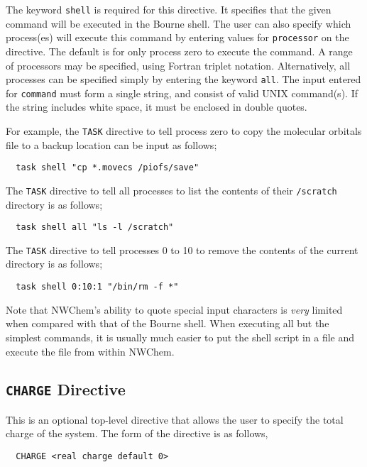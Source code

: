The keyword \verb+shell+ is required for this directive.  It specifies
that the given command will be executed in the Bourne shell.  The user
can also specify which process(es) will execute this command by
entering values for \verb+processor+ on the directive.  The default is
for only process zero to execute the command.  A range of processors
may be specified, using Fortran triplet notation.  Alternatively, all
processes can be specified simply by entering the keyword \verb+all+.
The input entered for \verb+command+ must form a single string, and
consist of valid UNIX command(s).  If the string includes white space,
it must be enclosed in double quotes.

For example, the \verb+TASK+ directive to tell process zero to copy the 
molecular orbitals file to a backup location can be input as follows;

\begin{verbatim}
  task shell "cp *.movecs /piofs/save"
\end{verbatim}

The \verb+TASK+ directive to tell all processes to list the contents of 
their \verb+/scratch+ directory is as follows;

\begin{verbatim}
  task shell all "ls -l /scratch"
\end{verbatim}

The \verb+TASK+ directive to tell processes 0 to 10 to remove the 
contents of the current directory is as follows;

\begin{verbatim}
  task shell 0:10:1 "/bin/rm -f *"
\end{verbatim}

Note that NWChem's ability to quote special input characters is {\em
  very} limited when compared with that of the Bourne shell.  When
executing all but the simplest commands, it is usually much easier to
put the shell script in a file and execute the file from within
NWChem.

\subsection{{\tt CHARGE} Directive}
\label{sec:charge}

This is an optional top-level directive that allows the user to specify
the total charge of the system.  The form of the directive is as follows,
\begin{verbatim}
  CHARGE <real charge default 0>
\end{verbatim}

